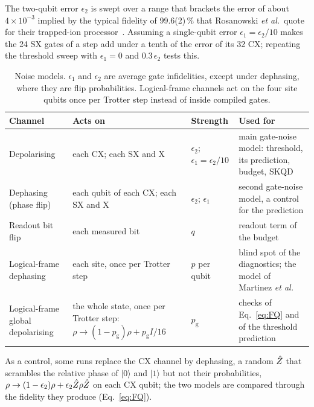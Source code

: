 The two-qubit error $\epsilon_2$ is swept over a range that brackets the
error of about $4\times10^{-3}$ implied by the typical fidelity of 99.6(2)\,\%
that Rosanowski \emph{et al.}\ quote for their trapped-ion
processor~\cite{rosanowski2025}. Assuming a single-qubit error $\epsilon_1
= \epsilon_2/10$ makes the 24 SX gates of a step add under a tenth of the error
of its 32 CX; repeating the threshold sweep with $\epsilon_1 = 0$ and
$0.3\,\epsilon_2$ tests this.

\begin{table}[tbp]
  \centering
  \caption{Noise models. $\epsilon_1$ and $\epsilon_2$ are average gate
  infidelities, except under dephasing, where they are flip probabilities.
  Logical-frame channels act on the four site qubits once per Trotter step
  instead of inside compiled gates.}
  \label{tab:noise}
  \small
  \begin{tabular}{@{}>{\raggedright\arraybackslash}p{3.0cm}>{\raggedright\arraybackslash}p{3.9cm}>{\raggedright\arraybackslash}p{2.3cm}>{\raggedright\arraybackslash}p{5.6cm}@{}}
    \toprule
    Channel & Acts on & Strength & Used for \\
    \midrule
    Depolarising & each CX; each SX and X & $\epsilon_2$; $\epsilon_1 = \epsilon_2/10$
      & main gate-noise model: threshold, its prediction, budget, SKQD \\
    Dephasing (phase flip) & each qubit of each CX; each SX and X & $\epsilon_2$; $\epsilon_1$
      & second gate-noise model, a control for the prediction \\
    Readout bit flip & each measured bit & $q$ & readout term of the budget \\
    Logical-frame dephasing & each site, once per Trotter step & $p$ per qubit
      & blind spot of the diagnostics; the model of Martinez \emph{et al.}~\cite{martinez2016} \\
    Logical-frame global depolarising & the whole state, once per Trotter step:
      $\rho \to (1-p_{\mathrm{g}})\rho + p_{\mathrm{g}}I/16$ & $p_{\mathrm{g}}$
      & checks of Eq.~\eqref{eq:FQ} and of the threshold prediction \\
    \bottomrule
  \end{tabular}
\end{table}

As a control, some runs replace the CX channel by dephasing, a random
$\hat{Z}_{}$ that scrambles the relative phase of $|0\rangle$ and $|1\rangle$ but
not their probabilities, $\rho \to (1-\epsilon_2)\rho +
\epsilon_2\hat{Z}_{}\rho\hat{Z}_{}$ on each CX qubit; the two models are compared
through the fidelity they produce (Eq.~\eqref{eq:FQ}).

